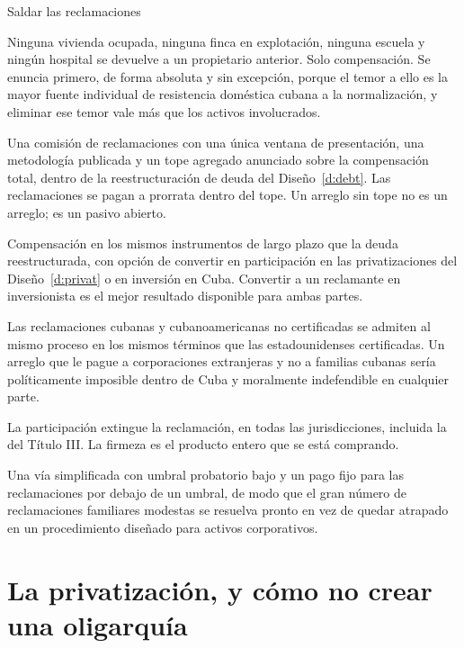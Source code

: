 \begin{design}{Saldar las reclamaciones}
\label{d:claims}
\begin{rules}
 Ninguna vivienda ocupada, ninguna finca en explotación,
ninguna escuela y ningún hospital se devuelve a un propietario anterior. Solo compensación. Se
enuncia primero, de forma absoluta y sin excepción, porque el temor a ello es la mayor fuente
individual de resistencia doméstica cubana a la normalización, y eliminar ese temor vale más que
los activos involucrados.

 Una comisión de reclamaciones con una única ventana de presentación,
una metodología publicada y un tope agregado anunciado sobre la compensación total, dentro de la
reestructuración de deuda del Diseño~\ref{d:debt}. Las reclamaciones se pagan a prorrata dentro
del tope. Un arreglo sin tope no es un arreglo; es un pasivo abierto.

 Compensación en los mismos instrumentos de largo plazo que la deuda
reestructurada, con opción de convertir en participación en las privatizaciones del
Diseño~\ref{d:privat} o en inversión en Cuba. Convertir a un reclamante en inversionista es el
mejor resultado disponible para ambas partes.

 Las reclamaciones cubanas y cubanoamericanas no
certificadas se admiten al mismo proceso en los mismos términos que las estadounidenses
certificadas. Un arreglo que le pague a corporaciones extranjeras y no a familias cubanas sería
políticamente imposible dentro de Cuba y moralmente indefendible en cualquier parte.

 La participación extingue la reclamación, en todas las jurisdicciones, incluida
la del Título III. La firmeza es el producto entero que se está comprando.

 Una vía simplificada con umbral probatorio bajo y un pago fijo para
las reclamaciones por debajo de un umbral, de modo que el gran número de reclamaciones
familiares modestas se resuelva pronto en vez de quedar atrapado en un procedimiento
diseñado para activos corporativos.
\end{rules}
\end{design}

\section{La privatización, y cómo no crear una oligarquía}

